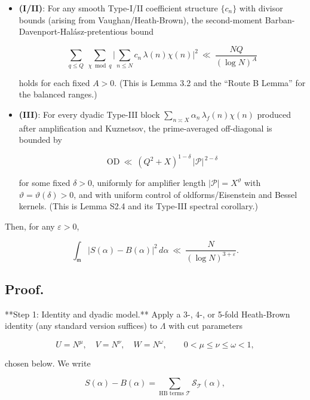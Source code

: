 \documentclass[11pt]{article}
\theoremstyle{definition}
\theoremstyle{remark}
\begin{document}
\begin{itemize}
	\item \textbf{(I/II)}: For any smooth Type-I/II coefficient structure $\{c_n\}$ with divisor bounds (arising from Vaughan/Heath-Brown), the second-moment Barban-Davenport-Halász-pretentious bound

	      \begin{equation}
		      \sum_{q\le Q}\ \sum_{\chi\bmod q}\Big|\sum_{n\le N} c_n\,\lambda(n)\chi(n)\Big|^2
		      \ \ll\ \frac{NQ}{(\log N)^A}
		      \tag{D.1}
	      \end{equation}

	      holds for each fixed $A>0$. (This is Lemma 3.2 and the “Route B Lemma” for the balanced ranges.)

	\item \textbf{(III)}: For every dyadic Type-III block $\sum_{n\asymp X}\alpha_n\,\lambda_f(n)\chi(n)$ produced after amplification and Kuznetsov, the prime-averaged off-diagonal is bounded by

	      \begin{equation}
		      \mathrm{OD}\ \ll\ (Q^2+X)^{1-\delta}\,|\mathcal P|^{\,2-\delta}
		      \tag{D.2}
	      \end{equation}

	      for some fixed $\delta>0$, uniformly for amplifier length $|\mathcal P|=X^\vartheta$ with $\vartheta=\vartheta(\delta)>0$, and with uniform control of oldforms/Eisenstein and Bessel kernels. (This is Lemma S2.4 and its Type-III spectral corollary.)
\end{itemize}

Then, for any $\varepsilon>0$,

$$
	\int_{\mathfrak m}\big|S(\alpha)-B(\alpha)\big|^2\,d\alpha
	\ \ll\ \frac{N}{(\log N)^{3+\varepsilon}}.
$$

\subsection*{Proof.}

**Step 1: Identity and dyadic model.**
Apply a 3-, 4-, or 5-fold Heath-Brown identity (any standard version suffices) to $\Lambda$ with cut parameters

$$
	U=N^{\mu},\quad V=N^{\nu},\quad W=N^{\omega},\qquad 0<\mu\le\nu\le\omega<1,
$$

chosen below. We write

$$
	S(\alpha)-B(\alpha)
	=\sum_{\text{HB terms }\mathcal T} \mathcal S_{\mathcal T}(\alpha),
$$
\end{document}
